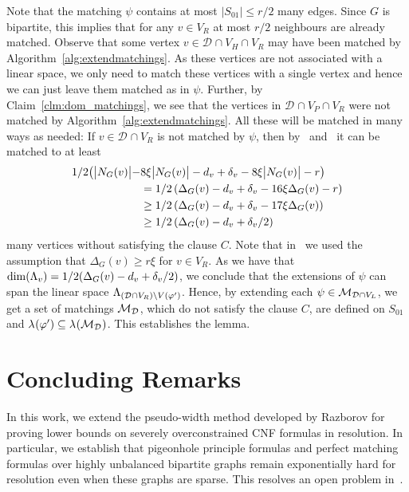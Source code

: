 \documentclass{theoretics}
\providecommand{\Abs}[1]{\bigl\lvert#1\bigr\rvert}
\newcommand{\Setsize}[1]{\bigl\lvert#1\bigr\rvert}
\newcommand{\setsize}[1]{\lvert#1\rvert}
\newcommand{\neigh}[2][]{N_{{#1}}(#2)}
\renewcommand{\deg}[2][XXXXXXXXXXXX]{\Delta_{#1}(#2)}
\newcommand{\diff}{\xi}
\newcommand{\ontodimLi}{1/2(\deg[G]{v} - d_v + \delta_v/2)}
\newcommand{\V}[1][]{V_{#1}}
\newcommand{\Vl}{\V[L]}
\newcommand{\Vr}{\V[R]}
\newcommand{\Vp}{\V[P]}
\newcommand{\Vh}{\V[H]}
\newcommand{\thr}[1]{ \ensuremath d_{{#1}} }
\newcommand{\adv}[1]{\delta_{{#1}}}
\newcommand{\linspace}[1][]{\ensuremath \Lambda_{{#1}}}
\newcommand{\linmap}[1][]{\ensuremath \lambda_{{#1}}}
\newcommand{\linmapof}[2][]{\linmap[#1](#2)}
\newcommand{\pseudowidth}{pseudo-width\xspace}
\newcommand{\diffclosure}[1][]{D_{{#1}}}
\renewcommand{\diffclosure}[1][]{\mathcal{D}_{{#1}}}
\newcommand{\vmatch}[1]{V(#1)}
\newcommand{\matchb}{\varphi'}
\newcommand{\matchc}{\psi}
\newcommand{\matchings}[1][]{\ensuremath \mathcal{M}_{{#1}}}
\numberwithin{equation}{section}
\begin{document}
  Note that the matching $\matchc$ contains at most 
  $\setsize{S_{01}} \leq r/2$ many edges. 
  Since $G$ is bipartite, this implies that for any $v \in \Vr$ at most 
  $r / 2$ neighbours are already matched.
  Observe that some vertex
  $v \in \diffclosure \cap \Vh \cap \Vr$ 
  may have been matched by Algorithm~\ref{alg:extendmatchings}. As
  these vertices are not associated with a linear space, we only need
  to match these vertices with a single vertex and hence we can just leave them
  matched as in $\matchc$.
  Further, by Claim~\ref{clm:dom_matchings},
  we see that the vertices in $\diffclosure \cap \Vp \cap \Vr$ were
  not matched by Algorithm~\ref{alg:extendmatchings}. All these will
  be matched in many ways as needed:
  If $v \in \diffclosure \cap \Vr$ is not matched by $\matchc$, then 
  by~ and~ it can 
  be matched to at least
  \begin{align}
  \nonumber
  	1/2 \big( \Setsize{ \neigh[G]{v} } - 
  	&8 \diff \Setsize{ \neigh[G]{v} }  - 
  	\thr{v} + \adv{v} - 8 \diff  \Abs{ \neigh[G]{v} } - r \big)\\
    \nonumber
  	&= 1/2 \left( \deg[G]{v} - \thr{v} + \adv{v} - 
  	16\diff\deg[G]{v} - r\right) \\
  	&\ge 1/2 \left( \deg[G]{v} - \thr{v} + \adv{v} - 
  	17\diff\deg[G]{v} \right)\label{eq:rsmall} \\
  	\nonumber
  	&\ge 1/2 \left( \deg[G]{v} - \thr{v} + \adv{v}/2\right)
  \end{align}
  many vertices without satisfying the clause $C$. 
  Note that in~ we used the assumption 
  that $\deg[G]{v} \ge r \diff$ for $v \in \Vr$. 
  As we have that
  $\dim(\linspace[v]) = \ontodimLi$, we conclude that
  the extensions of $\psi$ can span the linear space
  $\linspace[(\diffclosure \cap \Vr) \setminus \vmatch{\matchb}]$.
  Hence, by extending each $\matchc \in \matchings[\diffclosure \cap \Vl]$,
  we get a set of matchings $\matchings[\diffclosure]$, which do not satisfy the
  clause $C$, are defined on $S_{01}$ and 
  $\linmapof{\matchb} \subseteq \linmapof{\matchings[\diffclosure]}$.
  This establishes the lemma.
 


\section{Concluding Remarks}
\label{sec:conclusion}

In this work, we extend the \pseudowidth method developed by 
Razborov \cite{Razborov04ResolutionLowerBoundsPM,Razborov03ResolutionLowerBoundsWFPHP} 
for proving lower bounds on severely overconstrained CNF formulas in
resolution.
In particular, we establish that pigeonhole principle formulas and
perfect matching formulas over highly unbalanced bipartite graphs 
remain exponentially hard for resolution even when these graphs are sparse.
This resolves an open problem in~\cite{Razborov04ResolutionLowerBoundsPM}.
\end{document}
